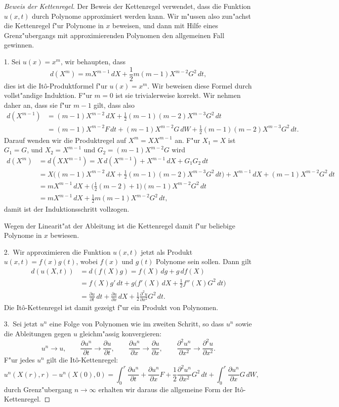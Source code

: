 \begin{proof}[Beweis der Kettenregel]
Der Beweis der Kettenregel verwendet, dass die Funktion $u(x,t)$ durch
Polynome approximiert werden kann.
Wir m"ussen also zun"achst die Kettenregel f"ur Polynome in $x$ beweisen,
und dann mit Hilfe eines Grenz"ubergangs mit approximierenden Polynomen
den allgemeinen Fall gewinnen.

1. Sei $u(x)=x^m$, wir behaupten, dass
\[
d(X^m)=mX^{m-1}\,dX + \frac12m(m-1)X^{m-2}G^2\,dt,
\]
dies ist die It\^o-Produktformel f"ur $u(x)=x^m$.
Wir beweisen diese Formel durch vollst"andige Induktion.
F"ur $m=0$ ist sie trivialerweise korrekt.
Wir nehmen daher an, dass sie f"ur $m-1$ gilt, dass also
\begin{align*}
d(X^{m-1})
&=
(m-1)X^{m-2}\,dX + \frac12(m-1)(m-2)X^{m-3}G^2\,dt
\\
&=
(m-1)X^{m-2}F\,dt + (m-1)X^{m-2}G\,dW + \frac12(m-1)(m-2)X^{m-3}G^2\,dt.
\end{align*}
Darauf wenden wir die Produktregel auf $X^m = XX^{m-1}$ an.
F"ur $X_1=X$ ist $G_1=G$, und $X_2=X^{m-1}$ und
$ G_2 = (m-1)X^{m-2}G $
wird
\begin{align*}
d(X^m)
&=
d(XX^{m-1})
=
X\,d(X^{m-1}) + X^{m-1}\,dX +G_1G_2\,dt
\\
&=
X\biggl( (m-1)X^{m-2}\,dX + \frac12(m-1)(m-2)X^{m-3}G^2\,dt\biggr)
+
X^{m-1}\,dX
+
(m-1)X^{m-2}G^2\,dt
\\
&=
mX^{m-1}\,dX
+\biggl(\frac12(m-2)+1\biggr)(m-1)X^{m-2}G^2\,dt
\\
&=
mX^{m-1}\,dX +\frac12m(m-1)X^{m-2}G^2\,dt,
\end{align*}
damit ist der Induktionsschritt vollzogen.

Wegen der Linearit"at der Ableitung ist die Kettenregel damit
f"ur beliebige Polynome in $x$ bewiesen.

2.~Wir approximieren die Funktion $u(x,t)$ jetzt als Produkt
$u(x,t)=f(x)g(t)$, wobei $f(x)$ und $g(t)$ Polynome sein sollen.
Dann gilt
\begin{align*}
d(u(X,t))
&=
d(f(X)g)
=
f(X)\,dg + g\,df(X)
\\
&=
f(X)g'\,dt + g\biggl(f'(X)\,dX + \frac12 f''(X)G^2\,dt\biggr)
\\
&=
\frac{\partial u}{\partial t}\,dt
+
\frac{\partial u}{\partial x}\,dX
+
\frac12\frac{\partial^2u}{\partial x^2}G^2\,dt.
\end{align*}
Die It\^o-Kettenregel ist damit gezeigt f"ur ein Produkt von Polynomen.

3.~Sei jetzt $u^n$ eine Folge von Polynomen wie im zweiten Schritt,
so dass $u^n$ sowie die Ableitungen gegen $u$ gleichm"assig konvergieren:
\[
u^n\to u,
\qquad
\frac{\partial u^n}{\partial t} \to \frac{\partial u}{\partial t},
\qquad
\frac{\partial u^n}{\partial x} \to \frac{\partial u}{\partial x},
\qquad
\frac{\partial^2 u^n}{\partial x^2} \to \frac{\partial^2 u}{\partial x^2}.
\]
F"ur jedes $u^n$ gilt die It\^o-Kettenregel:
\[
u^n(X(r),r)-u^n(X(0),0)
=
\int_0^r
\frac{\partial u^n}{\partial t}
+
\frac{\partial u^n}{\partial x}F
+
\frac12 \frac{\partial^2 u^n}{\partial x^2}G^2\,dt
+
\int_0^r\frac{\partial u^n}{\partial x}G\,dW,
\]
durch Grenz"ubergang $n\to \infty$ erhalten wir daraus die allgemeine
Form der It\^o-Kettenregel.
\end{proof}

